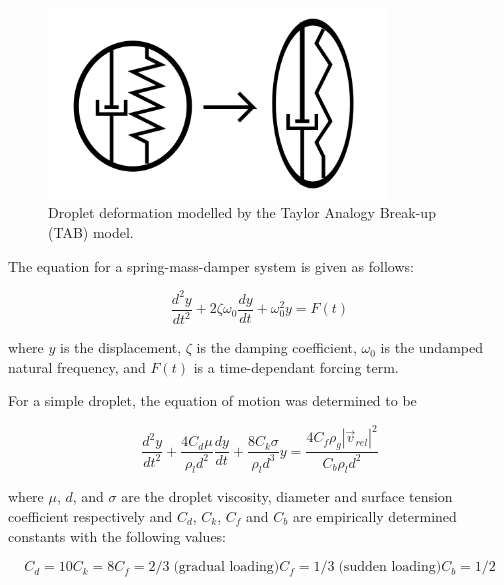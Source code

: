 \documentclass[12pt]{article}
\begin{document}
\begin{figure}[h] \label{fig:TabDroplet}
\centering
\includegraphics[width=0.8\textwidth]{TABDroplet.png}
\caption{Droplet deformation modelled by the Taylor Analogy Break-up (TAB) model.}
\end{figure} 

The equation for a spring-mass-damper system is given as follows:

\begin{equation}
\frac{d^{2}y}{dt^{2}} + 2 \zeta \omega_{0} \frac{dy}{dt} + \omega_{0}^{2}y = F(t)
\end{equation}

where $y$ is the displacement, $\zeta$ is the damping coefficient, $\omega_{0}$ is the undamped natural frequency, and $F(t)$ is a time-dependant forcing term.

For a simple droplet, the equation of motion was determined to be

\begin{equation}\label{eq:TabPde}
\frac{d^{2}y}{dt^{2}} + \frac{4C_{d}\mu}{\rho_{l}d^{2}}\frac{dy}{dt} + \frac{8C_{k}\sigma}{\rho_{l}d^{3}}y = \frac{4C_{f}\rho_{g}|\vec{v}_{rel}|^{2}}{C_{b}\rho_{l}d^{2}}
\end{equation}

where $\mu$, $d$, and $\sigma$ are the droplet viscosity, diameter and surface tension coefficient respectively and $C_{d}$, $C_{k}$, $C_{f}$ and $C_{b}$ are empirically determined constants with the following values:

\begin{subequations}
\begin{equation}
C_{d} = 10
\end{equation}
\begin{equation}
C_{k} = 8
\end{equation}
\begin{equation}
C_{f} = 2/3 \; \text{(gradual loading)}
\end{equation}
\begin{equation}
C_{f} = 1/3 \; \text{(sudden loading)}
\end{equation}
\begin{equation}
C_{b} = 1/2
\end{equation}
\end{subequations}
\end{document}
